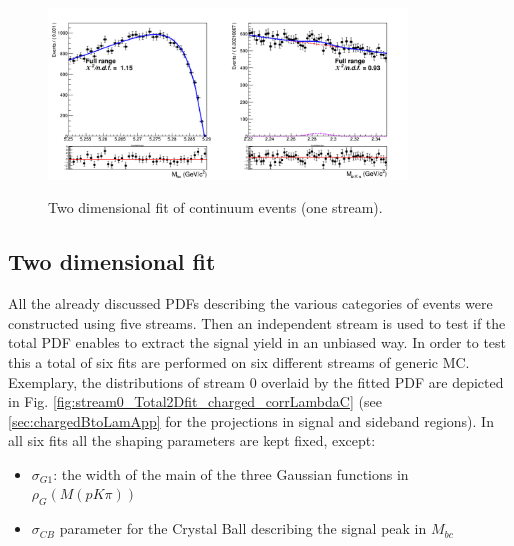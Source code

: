 
\begin{figure}[H]
{\includegraphics[width=0.85\textwidth]{04-chargedCorrBtoLambda/figs/stream3corrLambddaC_total_continuum_2DFit.png}}
\caption{Two dimensional fit of  continuum events (one stream).}
\label{fig:stream3corrLambddaC_total_continuum_2DFit}
\end{figure}


\vspace{5 cm}

\newpage
\subsection{Two dimensional fit}\label{2DtotalFit}

All the already discussed PDFs describing the various categories of events were constructed using five streams. Then an independent stream is used to test if the total PDF enables to extract the signal yield in an unbiased way.
 In order to test this a total of six fits are performed on six different streams of generic MC. Exemplary, the distributions of stream 0 overlaid by the fitted PDF are depicted in Fig. \ref{fig:stream0_Total2Dfit_charged_corrLambdaC} (see \cref{sec:chargedBtoLamApp} for the projections in signal and sideband regions). 
In all six fits all the shaping parameters are kept fixed, except:
\begin{itemize}
    \item $\sigma_{G1}$: the width of the main of the three Gaussian functions in $\rho_G(M(p K \pi))$
    \item $\sigma_{CB}$ parameter for the Crystal Ball describing the signal peak in $M_{bc}$
\end{itemize}

